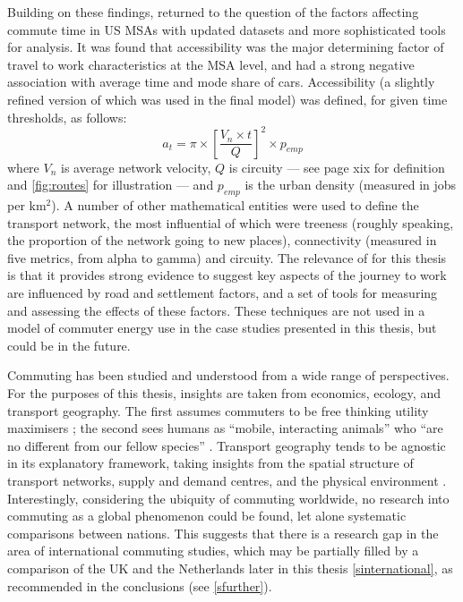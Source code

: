 \documentclass[a4paper, 11pt, twoside]{Thesis}
\begin{document}
Building on these findings, \citet{Levinson2012}
returned to the question of the factors affecting commute time in US
MSAs with updated datasets and more sophisticated tools for analysis.
It was found that accessibility was the major determining factor of
travel to work characteristics at the MSA level, and had a strong negative
association with average time and mode share of cars. Accessibility
(a slightly refined version of which was used in the final model) was defined,
for given time thresholds, as follows:
\begin{equation}
 a_t = \pi \times \left[ \frac{V_n \times t}{Q} \right]^2 \times p_{emp}
\end{equation}
where $V_n$ is average network velocity, $Q$ is circuity ---
see page xix for definition and \cref{fig:routes} for illustration ---
and $p_{emp}$ is the urban density (measured in jobs per km$^2$). A number of other
mathematical entities were used to define the transport network, the most
influential of which were treeness (roughly speaking, the proportion of the network going to
new places), connectivity (measured in five metrics, from alpha to gamma) and
circuity. The relevance of \citep{Levinson2012} for this thesis is that it
provides strong evidence to suggest key aspects of the journey to work are
influenced by road and settlement factors, and a set of tools for measuring
and assessing the effects of these factors. These techniques are not
used in a model of commuter energy use in the case studies presented in
this thesis, but could be in the future.


Commuting has been studied and understood from a wide range of
perspectives. For the purposes of this thesis, insights are taken from economics,
ecology, and transport geography. The first assumes commuters to
be free thinking utility maximisers \citep{Sexton2011}; the second sees humans
as ``mobile, interacting animals'' who ``are no different from our fellow
species'' \citep[p. 40]{Brockmann2012}. Transport geography tends to be
agnostic in its explanatory framework, taking insights from the spatial
structure of transport networks, supply and demand centres, and the physical
environment \citep{Rodrigue2009}.
Interestingly, considering the ubiquity of commuting worldwide, no
research into commuting as a global phenomenon could be found, let alone
systematic comparisons between nations.
This suggests that there is a research gap in the area of international
commuting studies, which may be partially filled by a comparison of the
UK and the Netherlands later in this thesis \cref{sinternational}, as
recommended in the conclusions (see \cref{sfurther}).
\end{document}
